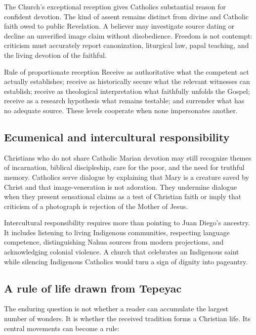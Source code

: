 The Church's exceptional reception gives Catholics substantial reason for confident devotion. The kind of assent remains distinct from divine and Catholic faith owed to public Revelation. A believer may investigate source dating or decline an unverified image claim without disobedience. Freedom is not contempt: criticism must accurately report canonization, liturgical law, papal teaching, and the living devotion of the faithful.

\begin{studybox}{Rule of proportionate reception}
Receive as authoritative what the competent act actually establishes; receive as historically secure what the relevant witnesses can establish; receive as theological interpretation what faithfully unfolds the Gospel; receive as a research hypothesis what remains testable; and surrender what has no adequate source. These levels cooperate when none impersonates another.
\end{studybox}

\subsection{Ecumenical and intercultural responsibility}

Christians who do not share Catholic Marian devotion may still recognize themes of incarnation, biblical discipleship, care for the poor, and the need for truthful memory. Catholics serve dialogue by explaining that Mary is a creature saved by Christ and that image-veneration is not adoration. They undermine dialogue when they present sensational claims as a test of Christian faith or imply that criticism of a photograph is rejection of the Mother of Jesus.

Intercultural responsibility requires more than pointing to Juan Diego's ancestry. It includes listening to living Indigenous communities, respecting language competence, distinguishing Nahua sources from modern projections, and acknowledging colonial violence. A church that celebrates an Indigenous saint while silencing Indigenous Catholics would turn a sign of dignity into pageantry.

\subsection{A rule of life drawn from Tepeyac}

The enduring question is not whether a reader can accumulate the largest number of wonders. It is whether the received tradition forms a Christian life. Its central movements can become a rule:

